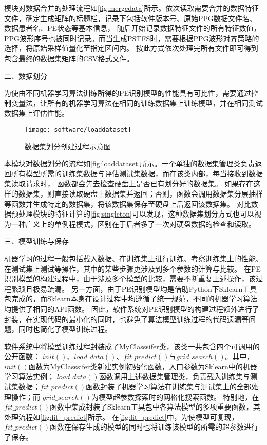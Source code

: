 模块对数据合并的处理流程如\autoref{fig:mergedata}所示。依次读取需要合并的数据特征文件，确定生成矩阵的标题栏，记录下包括软件版本号、原始PPG数据文件名、数据患者名、PE状态等基本信息，
随后开始记录数据特征文件的所有特征数值，PPG波形序号也被同时记录。而当生成PSTFS时，需要根据PPG波形对齐策略的选择，将原始采样值量化至指定区间内。
按此方式依次处理完所有文件即可得到包含最终的数据集矩阵的CSV格式文件。

二、数据划分

为使由不同机器学习算法训练所得的PE识别模型的性能具有可比性，需要通过控制变量法，让所有的机器学习算法在相同的训练数据集上训练模型，并在相同测试
数据集上评估性能。
\begin{figure}[htbp]
    \centering
    \texttt{[image: software/loaddataset]}
    \caption{\label{fig:loaddataset}数据集划分创建过程示意图}
\end{figure}

本模块对数据划分的流程如\autoref{fig:loaddataset}所示。一个单独的数据集管理类负责返回所有模型所需的训练集数据与评估测试集数据，而在该类内部，每当接收到数据集读取请求时，
函数都会先去检查硬盘上是否已有划分好的数据集。
如果存在这样的数据集，则直接读取硬盘上数据集并返回；否则，函数会调用数据集分层抽样等函数并生成特定的数据集，将该数据集保存至硬盘上后返回该数据集。
对比数据预处理模块的特征计算的\autoref{fig:singleton}可以发现，这种数据集划分方式也可以视为一种广义上的单例程模式，区别在于后者多了一次对硬盘数据的检查和读取。

三、模型训练与保存

机器学习的过程一般包括载入数据、在训练集上进行训练、考察训练集上的性能、在测试集上测试等操作，其中的某些步骤更涉及到多个参数的计算与比较。
在PE识别模型的构建过程中，由于涉及多个模型的比较，需要不断重复上述操作，该过程繁琐且极易疏漏。
另一方面，由于PE识别模型均是借助Python下Sklearn工具包完成的\cite{scikit-learn}，而Sklearn本身在设计过程中均遵循了统一规范，不同的机器学习算法均提供了相同的API函数。
因此，软件系统对PE识别模型的构建过程额外进行了封装，在实现代码的最小化的同时，也避免了算法模型训练过程的代码遗漏等问题，同时也简化了模型训练过程。

软件系统中将模型训练过程封装成了MyClasssifer类，该类一共包含四个可调用的公开函数：
$init()$、$load\_data()$、$fit\_predict()$与$grid\_search()$。其中，$init()$函数为MyClasssifer类新建实例初始化函数，入口参数为Sklearn中的机器学习算法实例；
$load\_data()$函数调用上述数据集管理类，负责载入训练集与测试集数据；$fit\_predict()$函数封装了机器学习算法在训练集与测试集上的全部处理操作；而
$grid\_search()$为模型超参数探索时的网格化搜索函数。
特别地，在$fit\_predict()$函数中集成封装了Sklearn工具包中各算法模型的多项重要函数，其处理流程如\autoref{fig:fit_predict}所示。
在\autoref{fig:fit_predict}中，为使模型可复现，$fit\_predict()$函数在保存生成的模型的同时也将训练该模型的所需的超参数进行了保存。


